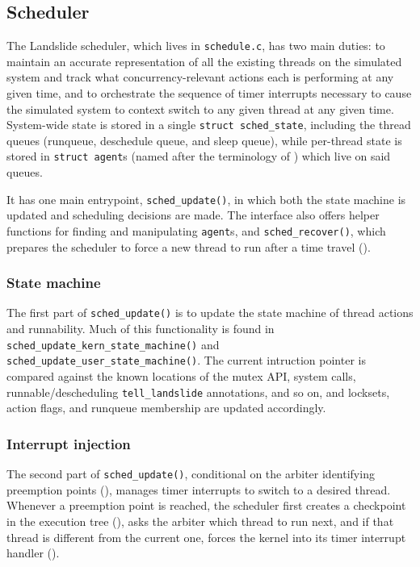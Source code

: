 
\subsection{Scheduler}
\label{sec:landslide-scheduler}

The Landslide scheduler, which lives in {\tt schedule.c}, has two main duties:
to maintain an accurate representation of all the existing threads on the simulated system
and track what concurrency-relevant actions each is performing at any given time,
and to orchestrate the sequence of timer interrupts necessary
to cause the simulated system to context switch to any given thread at any given time.
System-wide state is stored in a single {\tt struct sched\_state},
including the thread queues (runqueue, deschedule queue, and sleep queue),
while per-thread state is stored in {\tt struct agent}s (named after the terminology of \cite{dbug-ssv}) which live on said queues.

It has one main entrypoint, {\tt sched\_update()}, in which both the state machine is updated and scheduling decisions are made.
The interface also offers helper functions for finding and manipulating {\tt agent}s,
and {\tt sched\_recover()}, which prepares the scheduler to force a new thread to run
after a time travel (\sect{\ref{sec:landslide-timetravel}}).

\subsubsection{State machine}

The first part of {\tt sched\_update()} is to update the state machine of thread actions and runnability.
Much of this functionality is found in
{\tt sched\_update\_kern\_state\_machine()}
and
{\tt sched\_update\_user\_state\_machine()}.
The current intruction pointer is compared against the known locations of
the mutex API, system calls, runnable/descheduling {\tt tell\_\allowbreak{}landslide} annotations, and so on,
and locksets, action flags, and runqueue membership are updated accordingly.

\subsubsection{Interrupt injection}

The second part of {\tt sched\_update()},
conditional on the arbiter identifying preemption points (\sect{\ref{sec:landslide-arbiter}}),
manages timer interrupts to switch to a desired thread.
Whenever a preemption point is reached,
the scheduler first creates a checkpoint in the execution tree (\sect{\ref{sec:landslide-save}}),
asks the arbiter which thread to run next,
and if that thread is different from the current one,
forces the kernel into its timer interrupt handler (\sect{\ref{sec:landslide-interrupce}}).

